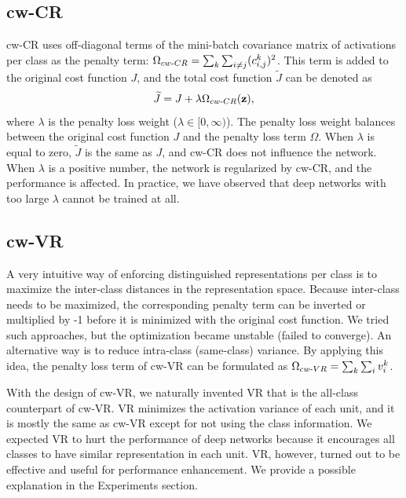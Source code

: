 \subsection{cw-CR}
cw-CR uses off-diagonal terms of the mini-batch covariance matrix of activations per class as the penalty term: ${\Omega}_{cw{\text -}CR}=\sum_k \sum_{i\neq j} (c_{i,j}^{k})^{2}$. This term is added to the original cost function $J$, and the total cost function $\widetilde{J}$ can be denoted as  
\begin{align}
    \widetilde{J}=J+\lambda{\Omega}_{cw{\text -}CR}(\mathbf{z}),
\end{align}
where $\lambda$ is the penalty loss weight ($\lambda \in [0, \infty)$). The penalty loss weight balances between the original cost function $J$ and the penalty loss term $\Omega$. When $\lambda$ is equal to zero, $\widetilde{J}$ is the same as $J$, and cw-CR does not influence the network. When $\lambda$ is a positive number, the network is regularized by cw-CR, and the performance is affected. In practice, we have observed that deep networks with too large $\lambda$ cannot be trained at all.

\subsection{cw-VR}
A very intuitive way of enforcing distinguished representations per class is to maximize the inter-class distances in the representation space. 
Because inter-class needs to be maximized, the corresponding penalty term can be inverted or multiplied by -1 before it is minimized with the original cost function. 
We tried such approaches, but the optimization became unstable (failed to converge).
%
An alternative way is to reduce intra-class (same-class) variance. By applying this idea, the penalty loss term of cw-VR can be formulated as ${\Omega}_{cw{\text -}VR}=\sum_k \sum_i v_{i}^k$. 

With the design of cw-VR, we naturally invented VR that is the all-class counterpart of cw-VR. VR minimizes the activation variance of each unit, and it is mostly the same as cw-VR except for not using the class information. We expected VR to hurt the performance of deep networks because it encourages all classes to have similar representation in each unit. VR, however, turned out to be effective and useful for performance enhancement. We provide a possible explanation in the Experiments section. 

